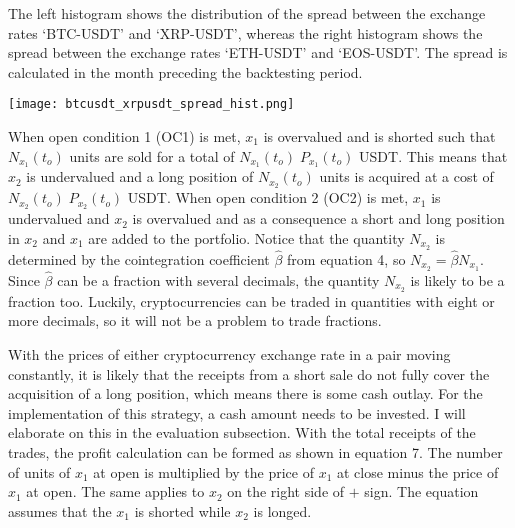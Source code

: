 \documentclass[12pt,english,authoryear]{article}
\begin{document}
\begin{center}
\begin{minipage}{\textwidth}
\caption*{\footnotesize The left histogram shows the distribution of the spread between the exchange rates ‘BTC-USDT’ and ‘XRP-USDT’, whereas the right histogram shows the spread between the exchange rates ‘ETH-USDT’ and ‘EOS-USDT’. The spread is calculated in the month preceding the backtesting period.}
\texttt{[image: btcusdt\_xrpusdt\_spread\_hist.png]}
\end{minipage}
\end{center}

When open condition 1 (OC1) is met, $x_1$ is overvalued and is shorted such that $N_{x_1}(t_o)$ units are sold for a total of $N_{x_1}(t_o) \; P_{x_1}(t_o)$ USDT. This means that $x_2$ is undervalued and a long position of $N_{x_2}(t_o)$ units is acquired at a cost of $N_{x_2}(t_o) \; P_{x_2}(t_o)$ USDT. When open condition 2 (OC2) is met, $x_1$ is undervalued and $x_2$ is overvalued and as a consequence a short and long position in $x_2$ and $x_1$ are added to the portfolio. Notice that the quantity $N_{x_2}$ is determined by the cointegration coefficient $\hat{\beta}$ from equation 4, so $N_{x_2} = \hat{\beta}N_{x_1}$. Since $\hat{\beta}$ can be a fraction with several decimals, the quantity $N_{x_2}$ is likely to be a fraction too. Luckily, cryptocurrencies can be traded in quantities with eight or more decimals\footnotemark, so it will not be a problem to trade fractions.


With the prices of either cryptocurrency exchange rate in a pair moving constantly, it is likely that the receipts from a short sale do not fully cover the acquisition of a long position, which means there is some cash outlay. For the implementation of this strategy, a cash amount needs to be invested. I will elaborate on this in the evaluation subsection. With the total receipts of the trades, the profit calculation can be formed as shown in equation 7. The number of units of $x_1$ at open is multiplied by the price of $x_1$ at close minus the price of $x_1$ at open. The same applies to $x_2$ on the right side of $+$ sign. The equation assumes that the $x_1$ is shorted while $x_2$ is longed. 
\end{document}
